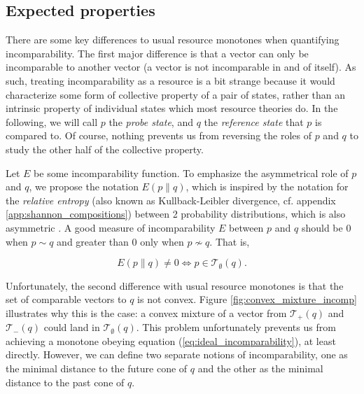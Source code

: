 \subsection{Expected properties}

There are some key differences to usual resource monotones when quantifying incomparability. The first major difference is that a vector can only be incomparable to another vector (a vector is not incomparable in and of itself). As such, treating incomparability as a resource is a bit strange because it would characterize some form of collective property of a pair of states, rather than an intrinsic property of individual states which most resource theories do. In the following, we will call $p$ the \textit{probe state}, and $q$ the \textit{reference state} that $p$ is compared to. Of course, nothing prevents us from reversing the roles of $p$ and $q$ to study the other half of the collective property. 

Let $E$ be some incomparability function. To emphasize the asymmetrical role of $p$ and $q$, we propose the notation $E(p \parallel q)$, which is inspired by the notation for the \textit{relative entropy} (also known as Kullback-Leibler divergence, cf. appendix \ref{app:shannon_compositions}) between 2 probability distributions, which is also asymmetric \cite[p. 19]{cover_elements_2006}. A good measure of incomparability $E$ between $p$ and $q$ should be 0 when $p \sim q$ and greater than 0 only when $p \nsim q$. That is,

\begin{equation} %
    E(p \parallel q) \neq 0 \iff p \in \mathcal{T}_\emptyset(q). \label{eq:ideal_incomparability}
\end{equation}

Unfortunately, the second difference with usual resource monotones is that the set of comparable vectors to $q$ is not convex. Figure \ref{fig:convex_mixture_incomp} illustrates why this is the case: a convex mixture of a vector from $\mathcal{T}_+(q)$ and $\mathcal{T}_-(q)$ could land in $\mathcal{T}_\emptyset(q)$. %
This problem unfortunately prevents us from achieving a monotone obeying equation (\ref{eq:ideal_incomparability}), at least directly. However, we can define two separate notions of incomparability, one as the minimal distance to the future cone of $q$ and the other as the minimal distance to the past cone of $q$.

